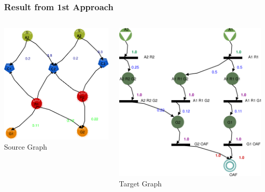 \documentclass[12pt]{beamer}
\begin{document}
\begin{frame}
\frametitle{Result from 1st Approach} 

\begin{columns}
	
		\begin{center}	
	\includegraphics[scale=0.44]{input} \\
	Source Graph
	\end{center}
	 
	 
	 \begin{center}	
	\includegraphics[scale=0.34]{output} \\
	Target Graph
	\end{center} 
	
\end{columns}

\end{frame}
\end{document}
